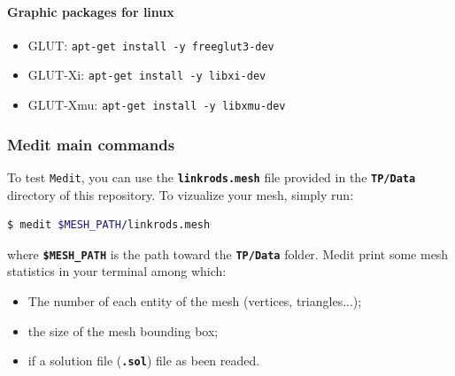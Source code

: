 \documentclass{article}
\newcommand{\ttb}[1]{\texttt{\textbf{#1}}}
\newcommand{\medit}{\texttt{Medit}}
\begin{document}
\paragraph{Graphic packages for linux}
\begin{itemize}
\item GLUT: \tt{apt-get install -y freeglut3-dev}
\item GLUT-Xi: \tt{apt-get install -y libxi-dev}
\item GLUT-Xmu: \tt{apt-get install -y libxmu-dev}
\end{itemize}


\subsubsection{Medit main commands\\}
To test \medit, you can use the \ttb{linkrods.mesh} file provided in the \ttb{TP/Data} directory of this repository. To vizualize your mesh, simply run:
\begin{lstlisting}[language=bash]
$ medit $MESH_PATH/linkrods.mesh
\end{lstlisting}
where \ttb{\$MESH\_PATH} is the path toward the \ttb{TP/Data} folder. Medit print some mesh statistics in your terminal among which:
\begin{itemize}
\item The number of each entity of the mesh (vertices, triangles...);
\item the size of the mesh bounding box;
\item if a solution file (\ttb{.sol}) file as been readed.\\
\end{itemize}
\end{document}
